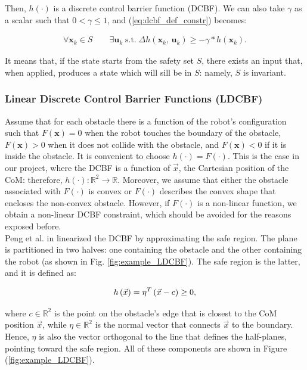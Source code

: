 Then, $h(\cdot)$ is a discrete control barrier function (DCBF). We can also take $\gamma$ as a scalar such that $0 < \gamma \leq 1$, and (\ref{eq:dcbf_def_constr}) becomes:

\begin{gather*}
    \forall \mathbf{x}_k \in S \qquad \exists \mathbf{u}_k \; \text{s.t.} \; \Delta h(\mathbf{x}_k,\, \mathbf{u}_k) \geq -\gamma * h(\mathbf{x}_k). 
\end{gather*}

It means that, if the state starts from the safety set $S$, there exists an input that, when applied, produces a state which will sill be in $S$: namely, $S$ is invariant.

\subsubsection{Linear Discrete Control Barrier Functions (LDCBF)}
Assume that for each obstacle there is a function of the robot's configuration such that $F(\mathbf{x})=0$ when the robot touches the boundary of the obstacle, $F(\mathbf{x})>0$ when it does not collide with the obstacle, and $F(\mathbf{x})<0$ if it is inside the obstacle. It is convenient to choose $h(\cdot)=F(\cdot)$. This is the case in our project, where the DCBF is a function of $\vec{x}$, the Cartesian position of the CoM: therefore, $h(\cdot)\colon \mathbb{R}^2 \rightarrow \mathbb{R}$. Moreover, we assume that either the obstacle associated with $F(\cdot)$ is convex or $F(\cdot)$ describes the convex shape that encloses the non-convex obstacle.
However, if $F(\cdot)$ is a non-linear function, we obtain a non-linear DCBF constraint, which should be avoided for the reasons exposed before.\\
Peng et al. in \cite{peng_main_paper} linearized the DCBF by approximating the safe region. The plane is partitioned in two halves: one containing the obstacle and the other containing the robot (as shown in Fig. \ref{fig:example_LDCBF}).
The safe region is the latter, and it is defined as:

\begin{equation} \notag
h\left(\vec{x}\right) = \eta^T \left(\vec{x} - c\right) \geq 0,
\end{equation}

where $c \in \mathbb{R}^2$ is the point on the obstacle's edge that is closest to the CoM position $\vec{x}$, while $\eta \in \mathbb{R}^2$ is the normal vector that connects $\vec{x}$ to the boundary. Hence, $\eta$ is also the vector orthogonal to the line that defines the half-planes, pointing toward the safe region. All of these components are shown in Figure (\ref{fig:example_LDCBF}).\\

